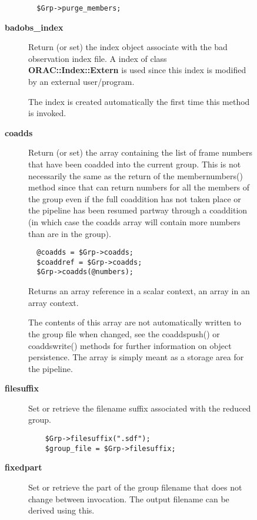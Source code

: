 \begin{description}
\begin{description}
\begin{description}
\begin{verbatim}
  $Grp->purge_members;
\end{verbatim}

\item[{\textbf{badobs\_index}}] \mbox{}

Return (or set) the index object associate with the bad observation
index file. A index of class \textbf{ORAC::Index::Extern} is used since
this index is modified by an external user/program.



The index is created automatically the first time this method
is invoked.


\item[{\textbf{coadds}}] \mbox{}

Return (or set) the array containing the list of frame numbers that have
been coadded into the current group. This is not necessarily the same
as the return of the membernumbers() method since that can return numbers
for all the members of the group even if the full coaddition has not
taken place or the pipeline has been resumed partway through a coaddition
(in which case the coadds array will contain more numbers than are in the
group).

\begin{verbatim}
  @coadds = $Grp->coadds;
  $coaddref = $Grp->coadds;
  $Grp->coadds(@numbers);
\end{verbatim}


Returns an array reference in a scalar context, an array in an
array context.



The contents of this array are not automatically written to the
group file when changed, see the coaddspush() or coaddswrite() methods
for further information on object persistence. The array is simply
meant as a storage area for the pipeline.


\item[{\textbf{filesuffix}}] \mbox{}

Set or retrieve the filename suffix associated with the
reduced group.

\begin{verbatim}
    $Grp->filesuffix(".sdf");
    $group_file = $Grp->filesuffix;
\end{verbatim}

\item[{\textbf{fixedpart}}] \mbox{}

Set or retrieve the part of the group filename that does not
change between invocation. The output filename can be derived using
this.


\end{description}
\end{description}
\end{description}
